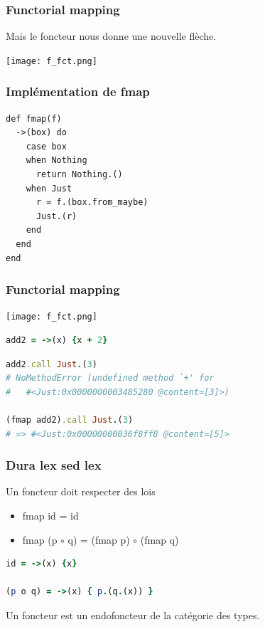 \documentclass{beamer}
\begin{document}
\begin{frame}
\frametitle{Functorial mapping}
Mais le foncteur nous donne une nouvelle flèche.
\begin{center}
\texttt{[image: f\_fct.png]}
\end{center}
\end{frame}

\begin{frame}[fragile]
  \frametitle{Implémentation de fmap}
  \begin{block}{}
    \begin{lstlisting}
def fmap(f)
  ->(box) do
    case box
    when Nothing
      return Nothing.()
    when Just
      r = f.(box.from_maybe)
      Just.(r)
    end
  end
end
    \end{lstlisting}
  \end{block}
\end{frame}

\begin{frame}[fragile]
\frametitle{Functorial mapping}
\begin{center}
\texttt{[image: f\_fct.png]}
\end{center}
\begin{block}{}
\begin{lstlisting}[language=ruby,basicstyle=\ttfamily,keywordstyle=\color{red}]
add2 = ->(x) {x + 2}
\end{lstlisting}
\end{block}

\begin{block}{}
\begin{lstlisting}[language=ruby,basicstyle=\ttfamily]
add2.call Just.(3)
# NoMethodError (undefined method `+' for
#   #<Just:0x0000000003485280 @content=[3]>)

(fmap add2).call Just.(3)
# => #<Just:0x00000000036f8ff8 @content=[5]>
\end{lstlisting}
\end{block}
\end{frame}



\begin{frame}[fragile]
\frametitle{Dura lex sed lex}
\begin{alertblock}{Un foncteur doit respecter des lois}
\begin{itemize}
\item fmap id = id
\item fmap (p $\circ$ q) = (fmap p) $\circ$ (fmap q)

\end{itemize}
\end{alertblock}
\pause
\begin{block}{}
\begin{lstlisting}[language=ruby]
id = ->(x) {x}

(p o q) = ->(x) { p.(q.(x)) }
\end{lstlisting}
\end{block}

\pause
Un foncteur est un endofoncteur de la catégorie des types.
\end{frame}
\end{document}
